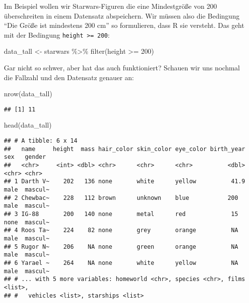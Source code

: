 \documentclass[
]{book}
\newenvironment{Shaded}{\begin{snugshade}}{\end{snugshade}}
\newcommand{\DecValTok}[1]{\textcolor[rgb]{0.00,0.00,0.81}{#1}}
\newcommand{\FunctionTok}[1]{\textcolor[rgb]{0.00,0.00,0.00}{#1}}
\newcommand{\NormalTok}[1]{#1}
\newcommand{\OtherTok}[1]{\textcolor[rgb]{0.56,0.35,0.01}{#1}}
\newcommand{\SpecialCharTok}[1]{\textcolor[rgb]{0.00,0.00,0.00}{#1}}
\begin{document}
Im Beispiel wollen wir Starwars-Figuren die eine Mindestgröße von 200 überschreiten in einem Datensatz abspeichern. Wir müssen also die Bedingung ``Die Größe ist mindestens 200 cm'' so formulieren, dass R sie versteht. Das geht mit der Bedingung \texttt{height\ \textgreater{}=\ 200}:

\begin{Shaded}
\begin{Highlighting}[]
\NormalTok{data\_tall }\OtherTok{\textless{}{-}}\NormalTok{ starwars }\SpecialCharTok{\%\textgreater{}\%} 
  \FunctionTok{filter}\NormalTok{(height }\SpecialCharTok{\textgreater{}=} \DecValTok{200}\NormalTok{)}
\end{Highlighting}
\end{Shaded}

Gar nicht so schwer, aber hat das auch funktioniert? Schauen wir uns nochmal die Fallzahl und den Datensatz genauer an:

\begin{Shaded}
\begin{Highlighting}[]
\FunctionTok{nrow}\NormalTok{(data\_tall)}
\end{Highlighting}
\end{Shaded}

\begin{verbatim}
## [1] 11
\end{verbatim}

\begin{Shaded}
\begin{Highlighting}[]
\FunctionTok{head}\NormalTok{(data\_tall)}
\end{Highlighting}
\end{Shaded}

\begin{verbatim}
## # A tibble: 6 x 14
##   name     height  mass hair_color skin_color eye_color birth_year sex   gender 
##   <chr>     <int> <dbl> <chr>      <chr>      <chr>          <dbl> <chr> <chr>  
## 1 Darth V~    202   136 none       white      yellow          41.9 male  mascul~
## 2 Chewbac~    228   112 brown      unknown    blue           200   male  mascul~
## 3 IG-88       200   140 none       metal      red             15   none  mascul~
## 4 Roos Ta~    224    82 none       grey       orange          NA   male  mascul~
## 5 Rugor N~    206    NA none       green      orange          NA   male  mascul~
## 6 Yarael ~    264    NA none       white      yellow          NA   male  mascul~
## # ... with 5 more variables: homeworld <chr>, species <chr>, films <list>,
## #   vehicles <list>, starships <list>
\end{verbatim}
\end{document}
